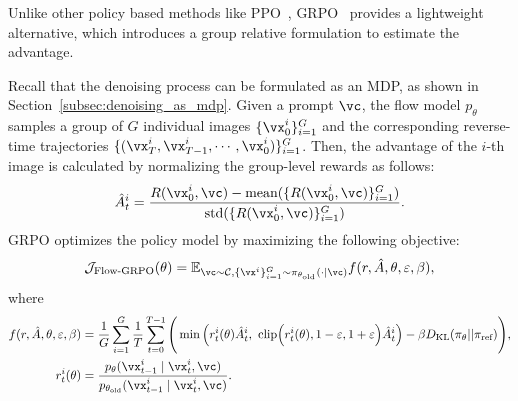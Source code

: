 Unlike other policy based methods like PPO~\cite{ppo}, GRPO~\cite{grpo} provides a lightweight alternative, which introduces a group relative formulation to estimate the advantage.

Recall that the denoising process can be formulated as an MDP, as shown in Section~\ref{subsec:denoising_as_mdp}.   
Given a prompt \(\vc\), the flow model \(p_{\theta}\) samples a group of \(G\) individual images \(\{\vx^i_0\}_{i=1}^G\) and the corresponding reverse-time trajectories \(\{(\vx^i_T, \vx^i_{T -1}, \cdots, \vx^i_0)\}_{i=1}^G\). Then, the advantage of the \(i\)-th image is calculated by normalizing the group-level rewards as follows:
\begin{equation}
\label{eq:grpo_advantage}
\hat{A}^i_t = \frac{R(\vx^i_0, \vc) - \text{mean}(\{R(\vx^i_0, \vc)\}_{i=1}^G)}{\text{std}(\{R(\vx^i_0, \vc)\}_{i=1}^G)}.
\end{equation}
GRPO optimizes the policy model by maximizing the following objective: 
\begin{equation}
\mathcal{J}_\text{Flow-GRPO}(\theta) = \mathbb{E}_{\vc\sim \mathcal{C}, \{\vx^i\}_{i=1}^G\sim \pi_{\theta_\text{old}}(\cdot\mid \vc)} f(r,\hat{A},\theta, \varepsilon, \beta),
\label{eq:grpoloss}
\end{equation}
where
\begin{align*}
f(r,\hat{A},\theta, \varepsilon, \beta) &=
\frac{1}{G}\sum_{i=1}^{G} \frac{1}{T}\sum_{t=0}^{T-1} \Bigg( 
\min \Big( r^i_t(\theta) \hat{A}^i_t,  
\ \text{clip} \Big( r^i_t(\theta), 1 - \varepsilon, 1 + \varepsilon \Big) \hat{A}^i_t \Big)
- \beta D_{\text{KL}}(\pi_{\theta} || \pi_{\text{ref}}) 
\Bigg), \\
r^i_t(\theta) &=
\frac{p_{\theta}(\vx^i_{t-1} \mid \vx^i_t, \vc)}{p_{\theta_{\text{old}}}(\vx^i_{t-1} \mid \vx^i_t, \vc)}.
\end{align*}


